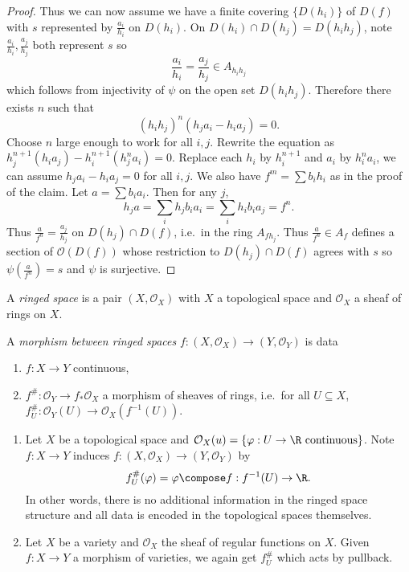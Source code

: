 \documentclass[a4paper]{article}
\newcommand{\sh}[1]{\mathcal{#1}} %
\begin{document}
\begin{proof}
  Thus we can now assume we have a finite covering \(\{D(h_i)\}\) of \(D(f)\) with \(s\) represented by \(\frac{a_i}{h_i}\) on \(D(h_i)\). On \(D(h_i) \cap D(h_j) = D(h_i h_j)\), note \(\frac{a_i}{h_i}, \frac{a_j}{h_j}\) both represent \(s\) so
  \[
    \frac{a_i}{h_i} = \frac{a_j}{h_j} \in A_{h_ih_j}
  \]
  which follows from injectivity of \(\psi\) on the open set \(D(h_ih_j)\). Therefore there exists \(n\) such that
  \[
    (h_ih_j)^n (h_j a_i - h_i a_j) = 0.
  \]
  Choose \(n\) large enough to work for all \(i, j\). Rewrite the equation as \(h_j^{n + 1} (h_ia_j) - h_i^{n + 1} (h_j^n a_i) = 0\). Replace each \(h_i\) by \(h_i^{n + 1}\) and \(a_i\) by \(h_i^n a_i\), we can assume \(h_ja_i - h_ia_j = 0\) for all \(i, j\). We also have \(f^m = \sum b_ih_i\) as in the proof of the claim. Let \(a = \sum b_i a_i\). Then for any \(j\),
  \[
    h_j a = \sum_i h_jb_ia_i = \sum_i h_ib_ia_j = f^n.
  \]
  Thus \(\frac{a}{f^n} = \frac{a_j}{h_j}\) on \(D(h_j) \cap D(f)\), i.e.\ in the ring \(A_{fh_j}\). Thus \(\frac{a}{f^n} \in A_f\) defines a section of \(\sh O(D(f))\) whose restriction to \(D(h_j) \cap D(f)\) agrees with \(s\) so \(\psi(\frac{a}{f^n}) = s\) and \(\psi\) is surjective.
\end{proof}

\begin{definition}
  A \emph{ringed space} is a pair \((X, \sh O_X)\) with \(X\) a topological space and \(\sh O_X\) a sheaf of rings on \(X\).

  A \emph{morphism between ringed spaces} \(f: (X, \sh O_X) \to (Y, \sh O_Y)\) is data
  \begin{enumerate}
  \item \(f: X \to Y\) continuous,
  \item \(f^\#: \sh O_Y \to f_* \sh O_X\) a morphism of sheaves of rings, i.e.\ for all \(U \subseteq X\), \(f_U^\#: \sh O_Y(U) \to \sh O_X(f^{-1}(U))\).
  \end{enumerate}
\end{definition}

\begin{eg}\leavevmode
  \begin{enumerate}
  \item Let \(X\) be a topological space and \(\sh O_X(u) = \{\varphi: U \to \R \text{ continuous}\}\). Note \(f: X \to Y\) induces \(f: (X, \sh O_X) \to (Y, \sh O_Y)\) by
    \[
      f_U^\#(\varphi) = \varphi \compose f: f^{-1}(U) \to \R.
    \]
    In other words, there is no additional information in the ringed space structure and all data is encoded in the topological spaces themselves.
  \item Let \(X\) be a variety and \(\sh O_X\) the sheaf of regular functions on \(X\). Given \(f: X \to Y\) a morphism of varieties, we again get \(f_U^\#\) which acts by pullback.
  \end{enumerate}
\end{eg}
\end{document}
